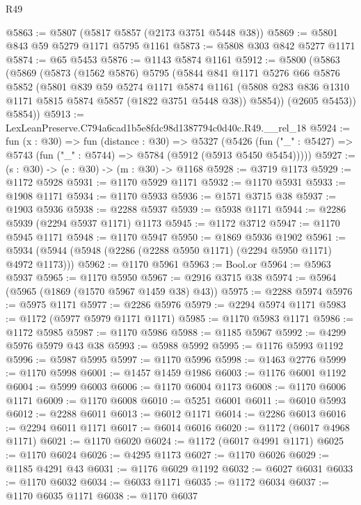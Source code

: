 \begin{lexlean}{R49}
\begin{coremodule}
@5863 := @5807 (@5817 @5857 (@2173 @3751 @5448 @38))
@5869 := @5801 @843 @59 @5279 @1171 @5795 @1161
@5873 := @5808 @303 @842 @5277 @1171
@5874 := @65 @5453
@5876 := @1143 @5874 @1161
@5912 := @5800
    (@5863
      (@5869
        (@5873
          (@1562 @5876)
          @5795
          (@5844
            @841
            @1171
            @5276
            @66
            @5876
            @5852
            (@5801
              @839
              @59
              @5274
              @1171
              @5874
              @1161
              (@5808 @283 @836 @1310 @1171 @5815 @5874 @5857 (@1822 @3751 @5448 @38))
              @5854))
          (@2605 @5453))
        @5854))
@5913 := LexLeanPreserve.C794a6cad1b5e8fdc98d1387794c0d40c.R49.__rel_18
@5924 := fun (x : @30) =>
  fun (distance : @30) =>
  @5327
    (@5426 (fun ("_" : @5427) => @5743 (fun ("_" : @5744) => @5784 (@5912 (@5913 @5450 @5454)))))
@5927 := (s : @30) -> (e : @30) -> (m : @30) -> @1168
@5928 := @3719 @1173
@5929 := @1172 @5928
@5931 := @1170 @5929 @1171
@5932 := @1170 @5931
@5933 := @1908 @1171
@5934 := @1170 @5933
@5936 := @1571 @3715 @38
@5937 := @1903 @5936
@5938 := @2288 @5937
@5939 := @5938 @1171
@5944 := @2286 @5939 (@2294 @5937 @1171) @1173
@5945 := @1172 @3712
@5947 := @1170 @5945 @1171
@5948 := @1170 @5947
@5950 := @1869 @5936 @1902
@5961 := @5934 (@5944 (@5948 (@2286 (@2288 @5950 @1171) (@2294 @5950 @1171) @4972 @1173)))
@5962 := @1170 @5961
@5963 := Bool.or
@5964 := @5963 @5937
@5965 := @1170 @5950
@5967 := @2916 @3715 @38
@5974 := @5964 (@5965 (@1869 (@1570 @5967 @1459 @38) @43))
@5975 := @2288 @5974
@5976 := @5975 @1171
@5977 := @2286 @5976
@5979 := @2294 @5974 @1171
@5983 := @1172 (@5977 @5979 @1171 @1171)
@5985 := @1170 @5983 @1171
@5986 := @1172 @5985
@5987 := @1170 @5986
@5988 := @1185 @5967
@5992 := @4299 @5976 @5979 @43 @38
@5993 := @5988 @5992
@5995 := @1176 @5993 @1192
@5996 := @5987 @5995
@5997 := @1170 @5996
@5998 := @1463 @2776
@5999 := @1170 @5998
@6001 := @1457 @1459 @1986
@6003 := @1176 @6001 @1192
@6004 := @5999 @6003
@6006 := @1170 @6004 @1173
@6008 := @1170 @6006 @1171
@6009 := @1170 @6008
@6010 := @5251 @6001
@6011 := @6010 @5993
@6012 := @2288 @6011
@6013 := @6012 @1171
@6014 := @2286 @6013
@6016 := @2294 @6011 @1171
@6017 := @6014 @6016
@6020 := @1172 (@6017 @4968 @1171)
@6021 := @1170 @6020
@6024 := @1172 (@6017 @4991 @1171)
@6025 := @1170 @6024
@6026 := @4295 @1173
@6027 := @1170 @6026
@6029 := @1185 @4291 @43
@6031 := @1176 @6029 @1192
@6032 := @6027 @6031
@6033 := @1170 @6032
@6034 := @6033 @1171
@6035 := @1172 @6034
@6037 := @1170 @6035 @1171
@6038 := @1170 @6037

\end{coremodule}
\end{lexlean}
